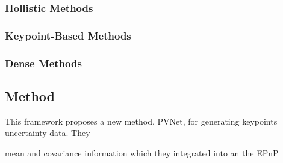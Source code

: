 \documentclass[11pt]{article}
\begin{document}
      \subsubsection{Hollistic Methods}

      \subsubsection{Keypoint-Based Methods}

      \subsubsection{Dense Methods}

      \subsection{Method}
      \par This framework proposes a new method, PVNet, for generating
      keypoints uncertainty data. They

      mean and covariance information which they integrated into
      an the EPnP \cite{ferraz2014leveraging}





\newpage


\end{document}
